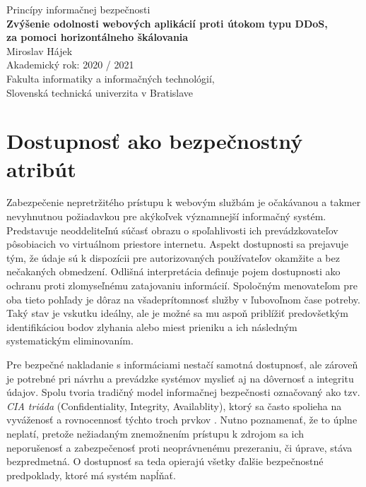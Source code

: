 \documentclass[12pt, a4paper]{article}
\begin{document}
\begin{titlepage}
    \hspace{0pt}
    \centering
    \vfill
    \large Princípy informačnej bezpečnosti \\
    \vspace{0.4cm}
    \vspace{1cm}
    \large \textbf{Zvýšenie odolnosti webových aplikácií proti útokom typu DDoS, 
          \\za pomoci horizontálneho škálovania  \\}
    \vspace{2.5cm}
    \normalsize Miroslav Hájek \\[0.2cm]
	Akademický rok: 2020 / 2021 \\[0.1cm]
	Fakulta informatiky a informačných technológií, \\
	Slovenská technická univerzita v Bratislave
    \vfill
\end{titlepage}


\tableofcontents
\newpage
{}
\setcounter{page}{1}

\section{Dostupnosť ako bezpečnostný atribút}
Zabezpečenie nepretržitého prístupu k webovým službám je očakávanou a takmer nevyhnutnou požiadavkou pre 
akýkoľvek významnejší informačný systém. Predstavuje neoddeliteľnú súčasť obrazu o spoľahlivosti 
ich prevádzkovateľov pôsobiacich vo virtuálnom priestore internetu. Aspekt dostupnosti sa prejavuje tým,
že údaje sú k dispozícii pre autorizovaných používateľov okamžite a bez nečakaných obmedzení. Odlišná 
interpretácia definuje pojem dostupnosti ako ochranu proti zlomyseľnému zatajovaniu informácií. Spoločným 
menovateľom pre oba tieto pohľady je dôraz na všadeprítomnosť služby v ľubovoľnom čase potreby. Taký stav
je vskutku ideálny, ale je možné sa mu aspoň priblížiť predovšetkým identifikáciou bodov zlyhania alebo 
miest prieniku a ich následným systematickým eliminovaním.

Pre bezpečné nakladanie s informáciami nestačí samotná dostupnosť, ale zároveň je potrebné pri návrhu a 
prevádzke systémov myslieť aj na dôvernosť a integritu údajov. Spolu tvoria tradičný model informačnej 
bezpečnosti označovaný ako tzv. \emph{CIA triáda} (Confidentiality, Integrity, Availablity), ktorý sa často 
spolieha na vyváženosť a rovnocennosť týchto troch prvkov \cite{availability}. Nutno poznamenať, 
že to úplne neplatí, pretože nežiadaným znemožnením prístupu k zdrojom sa ich neporušenosť a zabezpečenosť 
proti neoprávnenému prezeraniu, či úprave, stáva bezpredmetná. O dostupnosť sa teda opierajú všetky ďalšie
bezpečnostné predpoklady, ktoré má systém napĺňať.
\end{document}
